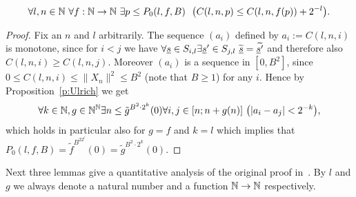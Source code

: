 \begin{lemma}[$P_0$ is correct]\label{l:P0}
\[
\forall l,n\in\mathbb{N}\ \forall f:\mathbb{N}\to\mathbb{N}\ \exists p\leq P_0(l,f,B)\ \ \big( C(l,n,p)\leq C(l,n,f(p)) + 2^{-l} \big).
\]
\end{lemma}
\begin{proof}
Fix an $n$ and $l$ arbitrarily. The sequence $(a_i)$ defined by
$
a_i:=C(l,n,i)
$
is monotone, since for $i<j$ we have $\forall \underline s \in S_{i,l}\exists \underline s'\in S_{j,l}\ \widetilde{\underline s}=\widetilde{\underline s'}$ and therefore also $C(l,n,i)\geq C(l,n,j)$. Moreover $(a_i)$
is a sequence in $[0,B^2]$, since $0\leq C(l,n,i)\leq \|X_n\|^2 \leq B^2$ (note that $B\geq1$) for any $i$.
Hence by Proposition~\ref{p:Ulrich} we get 
\[ \forall k\in\NN,g\in\NN^\NN\exists n\leq {\tilde g}^{B^2\cdot 2^k}(0)\forall i,j\in[n;n+g(n)]\ \big(|a_i-a_j|<2^{-k}\big), \]
which holds in particular also for $g=f$ and $k=l$ which implies that $P_0(l,f,B)=\tilde f^{B^22^l}(0)={\tilde g}^{B^2\cdot 2^k}(0)$.
\end{proof}

Next three lemmas give a quantitative analysis of the original proof in~\cite{Wittmann90}. By $l$ and $g$ we always denote a natural number and a function $\mathbb{N}\to\mathbb{N}$ respectively.

